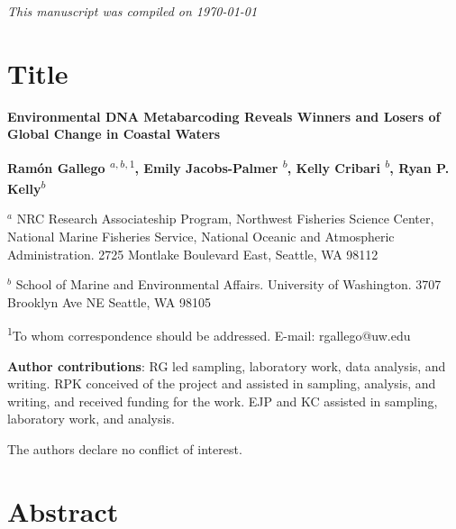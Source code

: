 \documentclass[11pt]{article}
\begin{document}
\begin{linenumbers}
       
   
\textit{\tiny	This manuscript was compiled on \today }	
\section{Title}

\textbf{ 
 Environmental DNA Metabarcoding Reveals Winners and Losers of Global Change in Coastal Waters }
\vspace*{1em}

\textbf{Ram\'{o}n Gallego \textsuperscript{$a,b,1$}, Emily Jacobs-Palmer \textsuperscript{$b$}, Kelly Cribari \textsuperscript{$b$}, Ryan P. Kelly}\textsuperscript{$b$}
\vspace{1em}


\textbf{$^a$} {\small NRC Research Associateship Program,
Northwest Fisheries Science Center,
National Marine Fisheries Service,
National Oceanic and Atmospheric Administration. 2725 Montlake Boulevard East, Seattle, WA 98112}

\textbf{$^b$} {\small School of Marine and Environmental Affairs. University of Washington. 3707 Brooklyn Ave NE Seattle, WA 98105}

{\textsuperscript{1}To whom correspondence should be addressed. E-mail: rgallego@uw.edu}

\vspace{1em}

\textbf{Author contributions}: RG led sampling, laboratory work, data analysis, and writing. RPK conceived of the project and assisted in sampling, analysis, and writing, and received funding for the work. EJP and KC assisted in sampling, laboratory work, and analysis.

\vspace{1em}

{\small The authors declare no conflict of interest.}



\section{Abstract}


\end{linenumbers}
\end{document}
